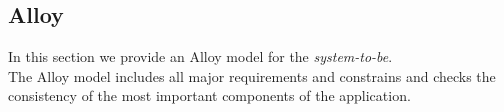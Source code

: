 \newpage
\subsection{Alloy} %
In this section we provide an Alloy model for the \emph{system-to-be}.\\
The Alloy model includes all major requirements and constrains and checks the consistency of the most important components of the application.


